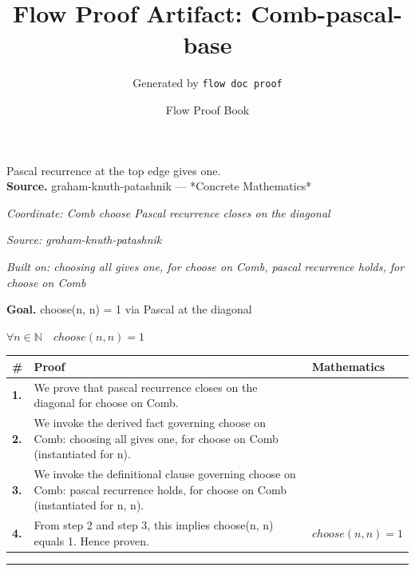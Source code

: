 \documentclass[11pt]{article}
\title{Flow Proof Artifact: Comb-pascal-base}
\author{Generated by \texttt{flow doc proof}}
\date{Flow Proof Book}
\theoremstyle{definition}
\begin{document}
\maketitle
Pascal recurrence at the top edge gives one.\\[0.5em]
\textbf{Source.} graham-knuth-patashnik — *Concrete Mathematics*\\[0.5em]
\bigskip
{}\par
\smallskip\noindent\textit{Coordinate: Comb \cdot choose \cdot Pascal recurrence closes on the diagonal}\par
\smallskip\noindent\textit{Source: graham-knuth-patashnik}\par
\smallskip\noindent\textit{Built on: choosing all gives one, for choose on Comb, pascal recurrence holds, for choose on Comb}\par
\medskip
\noindent\textbf{Goal.} choose(n, n) = 1 via Pascal at the diagonal\par
\noindent$\displaystyle \forall n \in \mathbb{N}\quad choose(n, n) = 1$\par
\medskip
\noindent
\begin{tabular}{@{} >{\raggedright\arraybackslash}p{} >{\raggedright\arraybackslash}p{} >{\raggedleft\arraybackslash}p{} @{}}
\textbf{\#} & \textbf{Proof} & \textbf{Mathematics} \\
\midrule
\textbf{1.} & We prove that pascal recurrence closes on the diagonal for choose on Comb. & \\[0.45em]
\textbf{2.} & We invoke the derived fact governing choose on Comb: choosing all gives one, for choose on Comb (instantiated for n). & \\[0.45em]
\textbf{3.} & We invoke the definitional clause governing choose on Comb: pascal recurrence holds, for choose on Comb (instantiated for n, n). & \\[0.45em]
\textbf{4.} & From step 2 and step 3, this implies choose(n, n) equals 1. Hence proven. & $\displaystyle choose(n, n) = 1$ \\[0.45em]
\bottomrule
\end{tabular}
\label{thm:Comb-choose-pascal_recurrence_closes_on_the_diagonal}
\par\medskip\hrule
\end{document}
